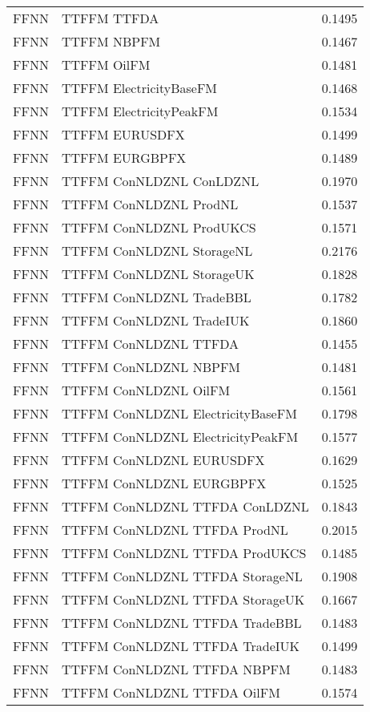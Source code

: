 \begin{table}[h!]
\begin{adjustbox}{max width=\textwidth}
\begin{tabular}{llr}
  FFNN & TTFFM TTFDA & 0.1495 \\ 
  FFNN & TTFFM NBPFM & 0.1467 \\ 
  FFNN & TTFFM OilFM & 0.1481 \\ 
  FFNN & TTFFM ElectricityBaseFM & 0.1468 \\ 
  FFNN & TTFFM ElectricityPeakFM & 0.1534 \\ 
  FFNN & TTFFM EURUSDFX & 0.1499 \\ 
  FFNN & TTFFM EURGBPFX & 0.1489 \\ 
  FFNN & TTFFM ConNLDZNL ConLDZNL & 0.1970 \\ 
  FFNN & TTFFM ConNLDZNL ProdNL & 0.1537 \\ 
  FFNN & TTFFM ConNLDZNL ProdUKCS & 0.1571 \\ 
  FFNN & TTFFM ConNLDZNL StorageNL & 0.2176 \\ 
  FFNN & TTFFM ConNLDZNL StorageUK & 0.1828 \\ 
  FFNN & TTFFM ConNLDZNL TradeBBL & 0.1782 \\ 
  FFNN & TTFFM ConNLDZNL TradeIUK & 0.1860 \\ 
  FFNN & TTFFM ConNLDZNL TTFDA & 0.1455 \\ 
  FFNN & TTFFM ConNLDZNL NBPFM & 0.1481 \\ 
  FFNN & TTFFM ConNLDZNL OilFM & 0.1561 \\ 
  FFNN & TTFFM ConNLDZNL ElectricityBaseFM & 0.1798 \\ 
  FFNN & TTFFM ConNLDZNL ElectricityPeakFM & 0.1577 \\ 
  FFNN & TTFFM ConNLDZNL EURUSDFX & 0.1629 \\ 
  FFNN & TTFFM ConNLDZNL EURGBPFX & 0.1525 \\ 
  FFNN & TTFFM ConNLDZNL TTFDA ConLDZNL & 0.1843 \\ 
  FFNN & TTFFM ConNLDZNL TTFDA ProdNL & 0.2015 \\ 
  FFNN & TTFFM ConNLDZNL TTFDA ProdUKCS & 0.1485 \\ 
  FFNN & TTFFM ConNLDZNL TTFDA StorageNL & 0.1908 \\ 
  FFNN & TTFFM ConNLDZNL TTFDA StorageUK & 0.1667 \\ 
  FFNN & TTFFM ConNLDZNL TTFDA TradeBBL & 0.1483 \\ 
  FFNN & TTFFM ConNLDZNL TTFDA TradeIUK & 0.1499 \\ 
  FFNN & TTFFM ConNLDZNL TTFDA NBPFM & 0.1483 \\ 
  FFNN & TTFFM ConNLDZNL TTFDA OilFM & 0.1574 \\ 

\end{tabular}
\end{adjustbox}
\end{table}

